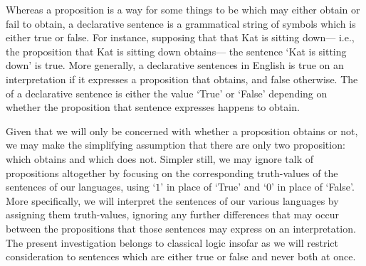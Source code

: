 Whereas a proposition is a way for some things to be which may either obtain or fail to obtain, a declarative sentence is a grammatical string of symbols which is either true or false.
For instance, supposing that that Kat is sitting down--- i.e., the proposition that Kat is sitting down obtains--- the sentence `Kat is sitting down' is true.
More generally, a declarative sentences in English is true on an interpretation if it expresses a proposition that obtains, and false otherwise.
The  of a declarative sentence is either the value `True' or `False' depending on whether the proposition that sentence expresses happens to obtain.

Given that we will only be concerned with whether a proposition obtains or not, we may make the simplifying assumption that there are only two proposition:  which obtains and  which does not.
Simpler still, we may ignore talk of propositions altogether by focusing on the corresponding truth-values of the sentences of our languages, using `$1$' in place of `True' and `$0$' in place of `False'.
More specifically, we will interpret the sentences of our various languages by assigning them truth-values, ignoring any further differences that may occur between the propositions that those sentences may express on an interpretation.
The present investigation belongs to classical logic insofar as we will restrict consideration to sentences which are either true or false and never both at once.




